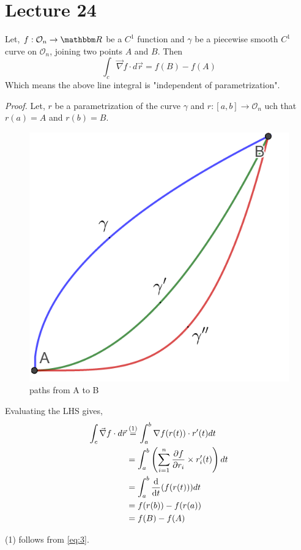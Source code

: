 \documentclass[../Analysis-3]{subfiles}
\begin{document}
\chapter*{Lecture 24} %
\setcounter{chapter}{24} %
\setcounter{section}{0}
\begin{Thm}{}{}\label{thm24:1}
    Let, $f: \mathcal{O}_n \to \R$ be a $C^1$ function and $\gamma$ be a piecewise smooth $C^1$ curve on $\mathcal{O}_n$, joining two points $A$ and $B$. Then
    \[\int_c \vec{\nabla}f\cdot d\vec{r} = f(B)-f(A)\]
    Which means the above line integral is "independent of parametrization".
\end{Thm}

\textit{Proof.} Let, $r$ be a parametrization of the curve $\gamma$ and $r :[a,b] \to \mathcal{O}_n$ uch that $r(a)=A$ and $r(b)=B$.

\begin{figure}
    \centering
    \includegraphics[width=.78\linewidth]{../figures/lec-24.1.png}
    \caption{paths from A to B}
\end{figure}

Evaluating the LHS gives,
\begin{align*}
    \int_c \vec{\nabla}f\cdot d\vec{r} & \overset{\mathrm{(1)}}{=} \int_a^b \nabla f(r(t)) \cdot r'(t) dt      \\
                                       & = \int_a^b \left(\sum_{i=1}^{n} \pdv{f}{r_i}\times r_i'(t) \right) dt \\
                                       & =\int_a^b \dv{t}(f(r(t))) dt                                          \\
                                       & = f(r(b)) - f(r(a))                                                   \\
                                       & = f(B) - f(A)
\end{align*}
\begin{center}
    (1) follows from \ref{eq:3}.
\end{center}
\end{document}
